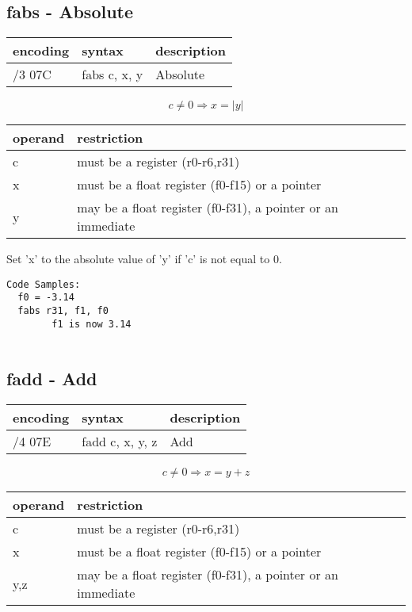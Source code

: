 \documentclass[letterpaper,10pt,openright,twoside,onecolumn]{book}
\begin{document}
\subsection{fabs - Absolute}
  \begin{tabular}{|l|l|l|}
   \hline
    encoding & syntax & description \\
   \hline
    /3 07C & fabs c, x, y & Absolute \\
   \hline
  \end{tabular}

  \begin{displaymath} c \neq 0 \Rightarrow x = |y|\end{displaymath}

  \flushleft
  \begin{tabular}{|l|l|}
   \hline
    operand & restriction \\
   \hline
    c & must be a register (r0-r6,r31) \\
    x & must be a float register (f0-f15) or a pointer \\
    y & may be a float register (f0-f31), a pointer or an immediate \\
   \hline
  \end{tabular}

  Set 'x' to the absolute value of 'y' if 'c' is not equal to 0.

  \begin{verbatim}
Code Samples:
  f0 = -3.14
  fabs r31, f1, f0
        f1 is now 3.14
	
  \end{verbatim}
\newpage\subsection{fadd - Add}
  \begin{tabular}{|l|l|l|}
   \hline
    encoding & syntax & description \\
   \hline
    /4 07E & fadd c, x, y, z & Add\\
   \hline
  \end{tabular}

  \begin{displaymath} c \neq 0 \Rightarrow x = y + z\end{displaymath}

  \flushleft
  \begin{tabular}{|l|l|}
   \hline
    operand & restriction \\
   \hline
    c & must be a register (r0-r6,r31) \\
    x & must be a float register (f0-f15) or a pointer \\
    y,z & may be a float register (f0-f31), a pointer or an immediate \\
   \hline
  \end{tabular}
\end{document}
